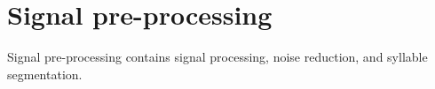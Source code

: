 %
%
%
%

%
%

 


\section{Signal pre-processing}
\label{pre-processing}

Signal pre-processing contains signal processing, noise reduction, and syllable segmentation. 


